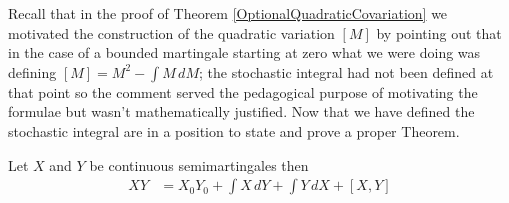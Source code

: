 Recall that in the proof of Theorem \ref{OptionalQuadraticCovariation} we motivated the construction of the quadratic variation $[M]$ by pointing out that in the case of a bounded martingale starting at zero what we were doing was defining $[M] = M^2 - \int M \, dM$; the stochastic integral had not been defined at that point so the comment served the pedagogical purpose of motivating the formulae but wasn't mathematically justified.  Now that we have defined the stochastic integral are in a position to state and prove a proper Theorem.
\begin{thm}\label{IntegrationByPartsContinuousSemimartingale}Let $X$ and $Y$ be continuous semimartingales then 
\begin{align*}
X Y &= X_0 Y_0 + \int X \, dY + \int Y \, dX + [X,Y]
\end{align*}
\end{thm}

